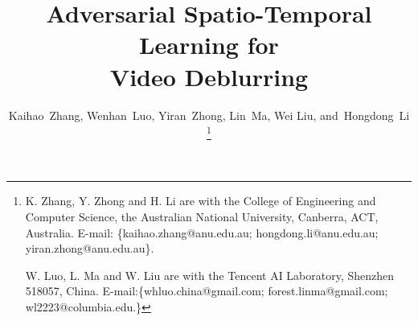 \documentclass[journal]{IEEEtran}
\begin{document}
%
\title{Adversarial Spatio-Temporal Learning for\\ Video Deblurring}
%
%
%

\author{Kaihao~Zhang,
        Wenhan~Luo,
        Yiran~Zhong,
        Lin~Ma,
        Wei Liu,
        and~Hongdong~Li%
\thanks{K. Zhang, Y. Zhong and H. Li are with the College of Engineering and Computer Science, the Australian National University, Canberra, ACT,  Australia. E-mail: \{kaihao.zhang@anu.edu.au; hongdong.li@anu.edu.au; yiran.zhong@anu.edu.au\}.

W. Luo, L. Ma and W. Liu are with the Tencent AI Laboratory, Shenzhen 518057, China. E-mail:\{whluo.china@gmail.com; forest.linma@gmail.com; wl2223@columbia.edu.\} }}%


%
%
\end{document}
